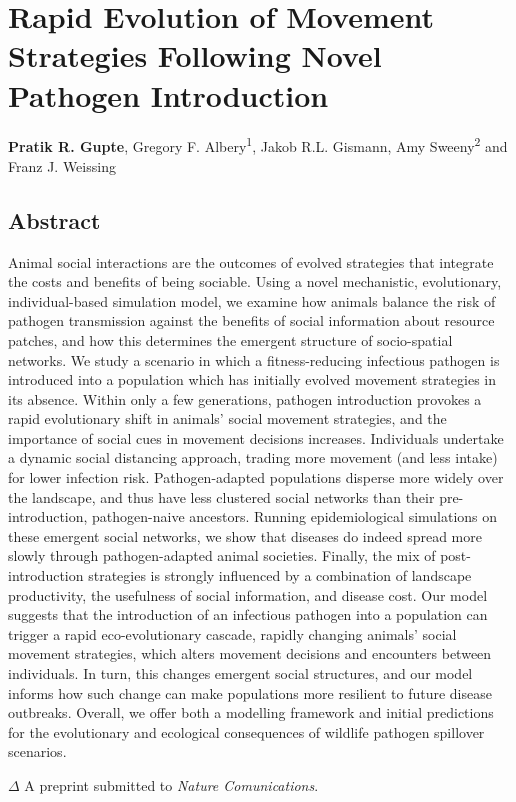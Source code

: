 \chapter{Rapid Evolution of Movement Strategies Following Novel Pathogen Introduction}\label{ch:pathomove}

{\noindent \textbf{Pratik R. Gupte}, Gregory F. Albery\textsuperscript{1}, Jakob R.L. Gismann, Amy Sweeny\textsuperscript{2} and Franz J. Weissing}


\section*{Abstract}

{
    \small
    Animal social interactions are the outcomes of evolved strategies that integrate the costs and benefits of being sociable.
    Using a novel mechanistic, evolutionary, individual-based simulation model, we examine how animals balance the risk of pathogen transmission against the benefits of social information about resource patches, and how this determines the emergent structure of socio-spatial networks.
    We study a scenario in which a fitness-reducing infectious pathogen is introduced into a population which has initially evolved movement strategies in its absence.
    Within only a few generations, pathogen introduction provokes a rapid evolutionary shift in animals' social movement strategies, and the importance of social cues in movement decisions increases.
    Individuals undertake a dynamic social distancing approach, trading more movement (and less intake) for lower infection risk.
    Pathogen-adapted populations disperse more widely over the landscape, and thus have less clustered social networks than their pre-introduction, pathogen-naive ancestors.
    Running epidemiological simulations on these emergent social networks, we show that diseases do indeed spread more slowly through pathogen-adapted animal societies.
    Finally, the mix of post-introduction strategies is strongly influenced by a combination of landscape productivity, the usefulness of social information, and disease cost.
    Our model suggests that the introduction of an infectious pathogen into a population can trigger a rapid eco-evolutionary cascade, rapidly changing animals' social movement strategies, which alters movement decisions and encounters between individuals. 
    In turn, this changes emergent social structures, and our model informs how such change can make populations more resilient to future disease outbreaks.
    Overall, we offer both a modelling framework and initial predictions for the evolutionary and ecological consequences of wildlife pathogen spillover scenarios.

    \bigskip

    {\noindent \large{$\Delta$}} A preprint submitted to \textit{Nature Comunications}.
}

\clearpage